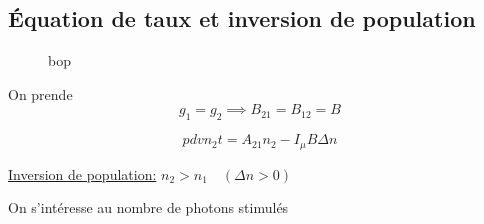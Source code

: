 \subsection{Équation de taux et inversion de population}


\begin{figure}[ht]
    \centering
    \caption{bop}
    \label{fig:bop}
\end{figure}


On prende $$g_1 = g_2 \implies B_{21} = B_{12} =B$$ 

$$pdv{n_{2}}{{t}} = A_{21} n_2 - I_{\mu} B \Delta n$$ 

\underline{Inversion de population:} $n_2 > n_1 \quad (\Delta n > 0)$  

On s'intéresse au nombre de photons stimulés




